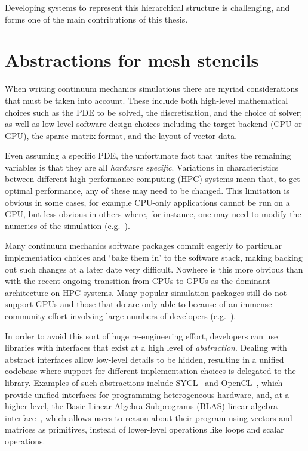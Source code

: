 \documentclass[thesis]{subfiles}
\begin{document}
Developing systems to represent this hierarchical structure is challenging, and forms one of the main contributions of this thesis.

\section{Abstractions for mesh stencils}
\label{sec:introduction_software}

When writing continuum mechanics simulations there are myriad considerations that must be taken into account.
These include both high-level mathematical choices such as the PDE to be solved, the discretisation, and the choice of solver; as well as low-level software design choices including the target backend (CPU or GPU), the sparse matrix format, and the layout of vector data.

Even assuming a specific PDE, the unfortunate fact that unites the remaining variables is that they are all \emph{hardware specific}.
Variations in characteristics between different high-performance computing (HPC) systems mean that, to get optimal performance, any of these may need to be changed.
This limitation is obvious in some cases, for example CPU-only applications cannot be run on a GPU, but less obvious in others where, for instance, one may need to modify the numerics of the simulation (e.g.~\cite{betteridgeCodeGenerationProductive2021}).

Many continuum mechanics software packages commit eagerly to particular implementation choices and `bake them in' to the software stack, making backing out such changes at a later date very difficult.
Nowhere is this more obvious than with the recent ongoing transition from CPUs to GPUs as the dominant architecture on HPC systems.
Many popular simulation packages still do not support GPUs and those that do are only able to because of an immense community effort involving large numbers of developers (e.g.~\cite{millsPETScTAODevelopments2024,MILLS2021102831,brownLibCEEDFastAlgebra2021,abdelfattahGPUAlgorithmsEfficient2021}).

In order to avoid this sort of huge re-engineering effort, developers can use libraries with interfaces that exist at a high level of \emph{abstraction}.
Dealing with abstract interfaces allow low-level details to be hidden, resulting in a unified codebase where support for different implementation choices is delegated to the library.
Examples of such abstractions include SYCL~\cite{SYCL2020Specification2020} and OpenCL~\cite{stoneOpenCLParallelProgramming2010a}, which provide unified interfaces for programming heterogeneous hardware, and, at a higher level, the Basic Linear Algebra Subprograms (BLAS) linear algebra interface~\cite{lawsonBasicLinearAlgebra1979}, which allows users to reason about their program using vectors and matrices as primitives, instead of lower-level operations like loops and scalar operations.
\end{document}
